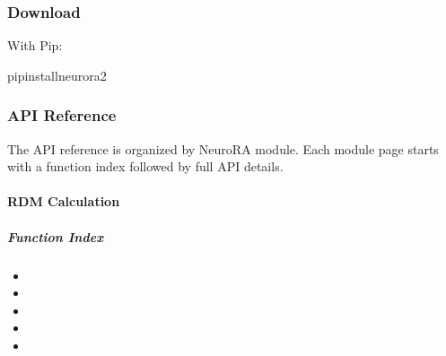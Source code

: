 \documentclass[letterpaper,10pt,english]{sphinxhowto}
\begin{document}
\sphinxstepscope


\subsubsection{Download}
\label{\detokenize{download:download}}\label{\detokenize{download::doc}}
\sphinxAtStartPar
With Pip:

\begin{sphinxVerbatim}[commandchars=\\\{\}]
pipinstallneurora2
\end{sphinxVerbatim}

\sphinxstepscope


\subsubsection{API Reference}
\label{\detokenize{api:api-reference}}\label{\detokenize{api::doc}}
\sphinxAtStartPar
The API reference is organized by NeuroRA module. Each module page starts with a function index followed by full API details.

\sphinxstepscope

\clearpage


\paragraph{RDM Calculation}
\label{\detokenize{rdm_cal:rdm-calculation}}\label{\detokenize{rdm_cal::doc}}
\sphinxAtStartPar
{}


\subparagraph{Function Index}
\label{\detokenize{rdm_cal:function-index}}\begin{itemize}
\item {} 
\sphinxAtStartPar
{}

\item {} 
\sphinxAtStartPar
{}

\item {} 
\sphinxAtStartPar
{}

\item {} 
\sphinxAtStartPar
{}

\item {} 
\sphinxAtStartPar
{}

\end{itemize}
\end{document}
